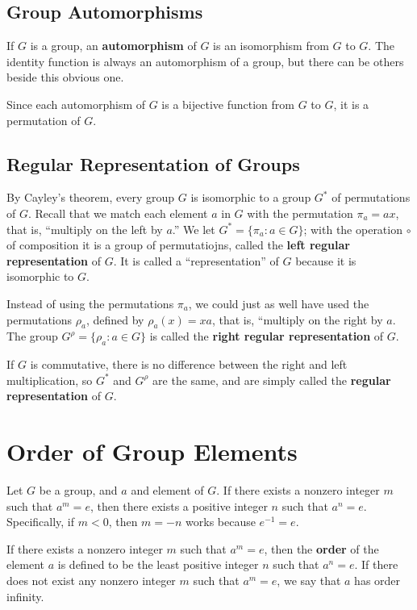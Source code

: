\documentclass[11pt]{article}
\begin{document}
\subsection{Group Automorphisms}\label{group-automorphisms}

If \(G\) is a group, an \textbf{automorphism} of \(G\) is an isomorphism
from \(G\) to \(G\). The identity function is always an automorphism of
a group, but there can be others beside this obvious one.

Since each automorphism of \(G\) is a bijective function from \(G\) to
\(G\), it is a permutation of \(G\).

\subsection{Regular Representation of
Groups}\label{regular-representation-of-groups}

By Cayley's theorem, every group \(G\) is isomorphic to a group \(G^*\)
of permutations of \(G\). Recall that we match each element \(a\) in
\(G\) with the permutation \(\pi_a = ax\), that is, ``multiply on the
left by \(a\).'' We let \(G^* = \{\pi_a : a \in G \}\); with the
operation \(\circ\) of composition it is a group of permutatiojns,
called the \textbf{left regular representation} of \(G\). It is called a
``representation'' of \(G\) because it is isomorphic to \(G\).

Instead of using the permutations \(\pi_a\), we could just as well have
used the permutations \(\rho_a\), defined by \(\rho_a(x) = xa\), that
is, ``multiply on the right by \(a\). The group
\(G^\rho = \{\rho_a : a \in G \}\) is called the \textbf{right regular
representation} of \(G\).

If \(G\) is commutative, there is no difference between the right and
left multiplication, so \(G^*\) and \(G^\rho\) are the same, and are
simply called the \textbf{regular representation} of \(G\).

    \section{Order of Group Elements}\label{order-of-group-elements}

Let \(G\) be a group, and \(a\) and element of \(G\). If there exists a
nonzero integer \(m\) such that \(a^m = e\), then there exists a
positive integer \(n\) such that \(a^n = e\). Specifically, if
\(m < 0\), then \(m = -n\) works because \(e^{-1} = e\).

If there exists a nonzero integer \(m\) such that \(a^m = e\), then the
\textbf{order} of the element \(a\) is defined to be the least positive
integer \(n\) such that \(a^n = e\). If there does not exist any nonzero
integer \(m\) such that \(a^m = e\), we say that \(a\) has order
infinity.
\end{document}
